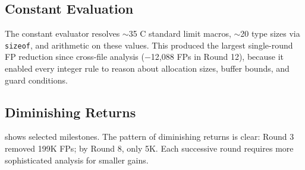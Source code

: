 \subsection{Constant Evaluation}

The constant evaluator resolves $\sim$35 C standard limit macros,
$\sim$20 type sizes via \texttt{sizeof}, and arithmetic on these
values.  This produced the largest single-round FP reduction since
cross-file analysis ($-$12,088 FPs in Round 12), because it enabled
every integer rule to reason about allocation sizes, buffer bounds,
and guard conditions.

\subsection{Diminishing Returns}

 shows selected milestones.  The pattern of
diminishing returns is clear: Round 3 removed 199K FPs; by Round 8,
only 5K.  Each successive round requires more sophisticated analysis
for smaller gains.

